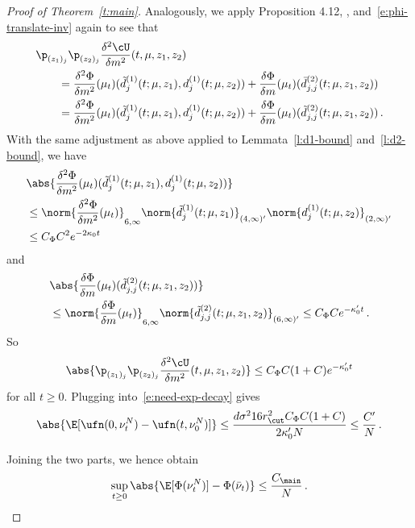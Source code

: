 \documentclass{amsart}
\begin{document}
\begin{proof}[Proof of Theorem~\ref{t:main}]
    Analogously, we apply Proposition 4.12, \cite{DelarueTse2021}, and~\eqref{e:phi-translate-inv} again to see that 
    \begin{align*}
        & \p_{(z_1)_j} \p_{(z_2)_j} \frac{\delta^2 \cU}{\delta m^2} (t,\mu,z_1,z_2) \\
        & \qquad = \frac{\delta^2 \Phi}{\delta m^2}(\mu_t) (\tilde d^{(1)}_j (t;\mu,{z_1}), d^{(1)}_j (t;\mu,{z_2})) + \frac{\delta \Phi}{\delta m} (\mu_t) (\bar d^{(2)}_{j,j} (t;\mu,{z_1},{z_2})) \\
        & \qquad = \frac{\delta^2 \Phi}{\delta m^2}(\mu_t) (\tilde d^{(1)}_j (t;\mu,{z_1}), d^{(1)}_j (t;\mu,{z_2})) + \frac{\delta \Phi}{\delta m} (\mu_t) (\tilde d^{(2)}_{j,j} (t;\mu,{z_1},{z_2})) \,.
    \end{align*}
    With the same adjustment as above applied to Lemmata~\ref{l:d1-bound} and~\ref{l:d2-bound}, we have
    \begin{align*}
        & \abs{\frac{\delta^2 \Phi}{\delta m^2}(\mu_t) (\tilde d^{(1)}_j(t;\mu,{z_1}), d^{(1)}_j(t;\mu,{z_2}))} \\
        & \le \norm{\frac{\delta^2 \Phi}{\delta m^2}(\mu_t) }_{6,\infty} \norm{\tilde d^{(1)}_j(t;\mu,{z_1})}_{(4,\infty)'} \norm{d^{(1)}_j(t;\mu,{z_2})}_{(2,\infty)'} \\
        & \le C_\Phi C^2 e^{-2\kappa_0 t}
    \end{align*}
    and 
    \begin{align*}
        & \abs{\frac{\delta \Phi}{\delta m} (\mu_t) (\tilde d^{(2)}_{j,j}(t;\mu,{z_1},{z_2}))} \\
        & \le \norm{\frac{\delta \Phi}{\delta m} (\mu_t)}_{6,\infty} \norm{ \tilde d^{(2)}_{j,j}(t;\mu,{z_1},{z_2}) }_{(6,\infty)'} \le C_\Phi C e^{-\kappa_0' t} \,.
    \end{align*}
    So 
    \begin{equation*}
        \abs{ \p_{(z_1)_j} \p_{(z_2)_j} \frac{\delta^2 \cU}{\delta m^2} (t,\mu,z_1,z_2) } \le C_\Phi C (1+C) e^{-\kappa_0' t} 
    \end{equation*}
    for all $t \ge 0$. 
    Plugging into~\eqref{e:need-exp-decay} gives 
    \begin{equation*}
        \abs{ \E[\ufn(0,\nu^N_t) - \ufn(t,\nu^N_0)] } \le \frac{d\sigma^2 16 r_\cut^2 C_\Phi C (1+C)}{2 \kappa_0' N} \le \frac{C'}{N} \,.
    \end{equation*}
    
    Joining the two parts, we hence obtain
    \begin{equation*}
        \sup_{t \ge 0} \abs{ \E[\Phi(\nu^N_t)] - \Phi(\bar\nu_t) } \le \frac{C_\main}{N} \,. 
    \end{equation*}
\end{proof}
\end{document}

